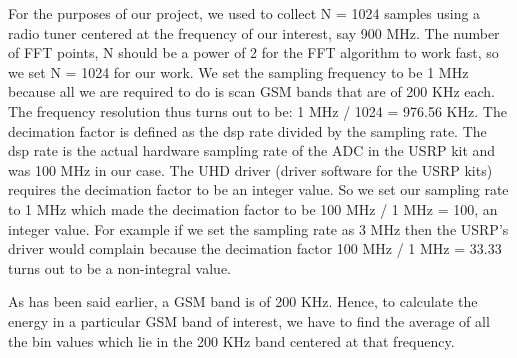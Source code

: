 For the purposes of our project, we used to collect N = 1024 samples using a 
radio tuner centered at the frequency of our interest, say 900 MHz. The number
of FFT points, N should be a power of 2 for the FFT algorithm to work fast, so
we set N = 1024 for our work. We set the sampling frequency to be 1 MHz 
because all we are required to do is scan GSM bands that are of 200 KHz each. 
The frequency resolution thus turns out to be: 1 MHz / 1024 = 976.56 KHz. The 
decimation factor is defined as the dsp rate divided by the sampling rate. The
dsp rate is the actual hardware sampling rate of the ADC in the USRP kit and 
was 100 MHz in our case. The UHD driver (driver software for the USRP kits)
requires the decimation factor to be an integer value. So we set our sampling 
rate to 1 MHz which made the decimation factor to be 100 MHz / 1 MHz = 100, an
integer value. For example if we set the sampling rate as 3 MHz then the 
USRP's driver would complain because the decimation factor 100 MHz / 1 MHz = 
33.33 turns out to be a non-integral value.

As has been said earlier, a GSM band is of 200 KHz. Hence, to calculate the 
energy in a particular GSM band of interest, we have to find the average of 
all the bin values which lie in the 200 KHz band centered at that frequency.


